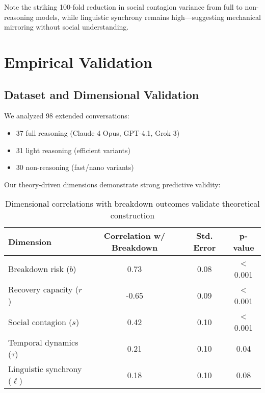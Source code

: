 \documentclass[11pt,letterpaper]{article}
\newcommand{\totalConversations}{98}
\newcommand{\fullReasoningCount}{37}
\newcommand{\lightReasoningCount}{31}
\newcommand{\nonReasoningCount}{30}
\newcommand{\breakdownRiskCorrelation}{0.73}
\newcommand{\breakdownRiskCorrelationSE}{0.08}
\newcommand{\recoveryCapacityCorrelation}{-0.65}
\newcommand{\recoveryCapacityCorrelationSE}{0.09}
\newcommand{\socialContagionCorrelation}{0.42}
\newcommand{\socialContagionCorrelationSE}{0.10}
\newcommand{\temporalDynamicsCorrelation}{0.21}
\newcommand{\temporalDynamicsCorrelationSE}{0.10}
\newcommand{\linguisticSynchronyCorrelation}{0.18}
\newcommand{\linguisticSynchronyCorrelationSE}{0.10}
\newcommand{\correlationPValueSignificant}{< 0.001}
\newcommand{\temporalDynamicsP}{0.04}
\newcommand{\linguisticSynchronyP}{0.08}
\newcommand{\socialVarianceReduction}{100} %
\begin{document}
Note the striking \socialVarianceReduction{}-fold reduction in social contagion variance from full to non-reasoning models, while linguistic synchrony remains high—suggesting mechanical mirroring without social understanding.

\section{Empirical Validation}

\subsection{Dataset and Dimensional Validation}

We analyzed \totalConversations{} extended conversations:
\begin{itemize}
    \item \fullReasoningCount{} full reasoning (Claude 4 Opus, GPT-4.1, Grok 3)
    \item \lightReasoningCount{} light reasoning (efficient variants)
    \item \nonReasoningCount{} non-reasoning (fast/nano variants)
\end{itemize}

Our theory-driven dimensions demonstrate strong predictive validity:

\begin{table}[h]
\centering
\begin{tabular}{lccc}
\toprule
Dimension & Correlation w/ Breakdown & Std. Error & p-value \\
\midrule
Breakdown risk ($b$) & \breakdownRiskCorrelation{} & \breakdownRiskCorrelationSE{} & \correlationPValueSignificant{} \\
Recovery capacity ($r$) & \recoveryCapacityCorrelation{} & \recoveryCapacityCorrelationSE{} & \correlationPValueSignificant{} \\
Social contagion ($s$) & \socialContagionCorrelation{} & \socialContagionCorrelationSE{} & \correlationPValueSignificant{} \\
Temporal dynamics ($\tau$) & \temporalDynamicsCorrelation{} & \temporalDynamicsCorrelationSE{} & \temporalDynamicsP{} \\
Linguistic synchrony ($\ell$) & \linguisticSynchronyCorrelation{} & \linguisticSynchronyCorrelationSE{} & \linguisticSynchronyP{} \\
\bottomrule
\end{tabular}
\caption{Dimensional correlations with breakdown outcomes validate theoretical construction}
\label{tab:validity}
\end{table}
\end{document}
